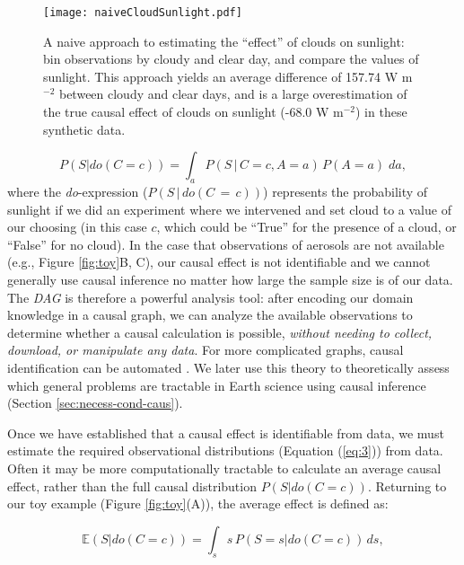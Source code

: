 \documentclass[12pt]{article}
\begin{document}
\begin{figure} \texttt{[image: naiveCloudSunlight.pdf]}
  \caption{A naive approach to estimating the ``effect'' of clouds on
    sunlight: bin observations by cloudy and clear day, and compare the
    values of sunlight. This approach yields an average difference of
    157.74 W m$^{-2}$ between cloudy and clear days, and is a large
    overestimation of the true causal effect of clouds on sunlight (-68.0
    W m$^{-2}$) in these synthetic data.}
  \label{fig:naive-cloud-sunlight}
\end{figure}

\begin{equation} P(S | do(C = c)) = \int_{a} P(S \, | \, C = c, A=a)
  \, P(A=a) \; da,
  \label{eq:3}
\end{equation} where the \textit{do}-expression ($P(S \, | \, do(C\, = \,c))$) represents the probability of sunlight
if we did an experiment where we intervened and set cloud to a value
of our choosing (in this case $c$, which could be ``True'' for the
presence of a cloud, or ``False'' for no cloud). In the case that
observations of aerosols are not available (e.g., Figure
\ref{fig:toy}B, C), our causal effect is not identifiable and we
cannot generally  use causal inference no matter how large the sample size is of our
data. The \emph{DAG} is therefore a powerful analysis tool: after encoding
our domain knowledge in a causal graph, we can analyze the available
observations to determine whether a causal calculation is possible,
\textit{without needing to collect, download, or manipulate any
  data}. For more complicated graphs, causal identification can be
automated \citep[][ \url{http://www.dagitty.net/}]{shpitser2006,
  textor2017}. We later use this theory to theoretically assess which
general problems are tractable in Earth science using causal inference
(Section \ref{sec:necess-cond-caus}).

Once we have established that a causal effect is identifiable from
data, we must estimate the required observational distributions
(Equation (\ref{eq:3})) from data. Often it may be more
computationally tractable to calculate an average causal effect,
rather than the full causal distribution $P(S | do(C=c))$. Returning
to our toy example (Figure \ref{fig:toy}(A)), the average effect is
defined as:

\begin{equation} \mathbb{E}(S | do(C = c)) = \int_{s} s \, P(S = s |
  do(C=c)) \, ds,
  \label{eq:4}
\end{equation}
\end{document}
